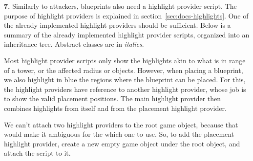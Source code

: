 \textbf{7.}
Similarly to attackers, blueprints also need a highlight provider script.
The purpose of highlight providers is explained in section~\ref{sec:docs-highlights}.
One of the already implemented highlight providers should be sufficient.
Below is a summary of the already implemented highlight provider scripts, organized into an inheritance tree.
Abstract classes are in \emph{italics}.
\pagebreak
{}
\

Most highlight provider scripts only show the highlights akin to what is in range of a tower, or the affected radius or objects.
However, when placing a blueprint, we also highlight in blue the regions where the blueprint can be placed.
For this, the highlight providers have reference to another highlight provider, whose job is to show the valid placement positions.
The main highlight provider then combines highlights from itself and from the placement highlight provider.

We can't attach two highlight providers to the root game object, because that would make it ambiguous for the  which one to use.
So, to add the placement highlight provider, create a new empty game object under the root object, and attach the script to it.

